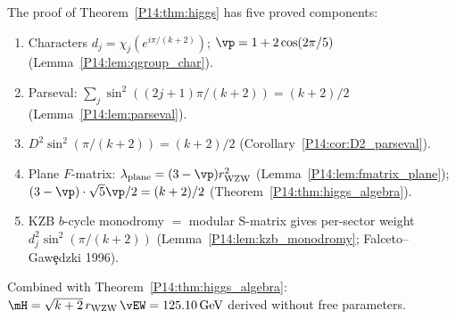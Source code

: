 \begin{remark}
\label{P14:rem:higgs_path}
The proof of Theorem~\ref{P14:thm:higgs} has five proved components:
\begin{enumerate}[noitemsep,label=(\roman*)]
\item Characters $d_j=\chi_j(e^{i\pi/(k+2)})$; $\vp=1+2\cos(2\pi/5)$
  (Lemma~\ref{P14:lem:qgroup_char}).
\item Parseval: $\sum_j\sin^2((2j+1)\pi/(k+2))=(k+2)/2$
  (Lemma~\ref{P14:lem:parseval}).
\item $D^2\sin^2(\pi/(k+2))=(k+2)/2$ (Corollary~\ref{P14:cor:D2_parseval}).
\item Plane $F$-matrix: $\lambda_{\mathrm{plane}}=(3-\vp)r_{\mathrm{WZW}}^2$
  (Lemma~\ref{P14:lem:fmatrix_plane}); $(3-\vp)\cdot\sqrt{5}\vp/2=(k+2)/2$
  (Theorem~\ref{P14:thm:higgs_algebra}).
\item KZB $b$-cycle monodromy $=$ modular S-matrix gives per-sector weight
  $d_j^2\sin^2(\pi/(k+2))$ (Lemma~\ref{P14:lem:kzb_monodromy};
  Falceto--Gaw\c{e}dzki 1996).
\end{enumerate}
Combined with Theorem~\ref{P14:thm:higgs_algebra}:
$\mH=\sqrt{k+2}\,r_{\mathrm{WZW}}\,\vEW=125.10\,\mathrm{GeV}$ derived without free parameters.
\end{remark}
